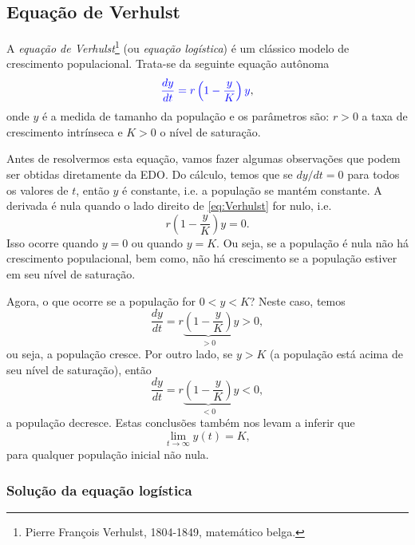 \subsection{Equação de Verhulst}

A \emph{equação de Verhulst}\footnote{Pierre François Verhulst, 1804-1849, matemático belga.} (ou \emph{equação logística}) é um clássico modelo de crescimento populacional. Trata-se da seguinte equação autônoma
\begin{equation}\label{eq:Verhulst}
  {\color{blue}\frac{dy}{dt} = r\left(1 - \frac{y}{K}\right)y},
\end{equation}
onde $y$ é a medida de tamanho da população e os parâmetros são: $r>0$ a taxa de crescimento intrínseca e $K>0$ o nível de saturação.

Antes de resolvermos esta equação, vamos fazer algumas observações que podem ser obtidas diretamente da EDO. Do cálculo, temos que se $dy/dt = 0$ para todos os valores de $t$, então $y$ é constante, i.e. a população se mantém constante. A derivada é nula quando o lado direito de \eqref{eq:Verhulst} for nulo, i.e.
\begin{equation}
  r\left(1 - \frac{y}{K}\right)y = 0.
\end{equation}
Isso ocorre quando $y = 0$ ou quando $y=K$. Ou seja, se a população é nula não há crescimento populacional, bem como, não há crescimento se a população estiver em seu nível de saturação.

Agora, o que ocorre se a população for $0 < y < K$? Neste caso, temos
\begin{equation}
  \frac{dy}{dt} = r\underbrace{\left(1 - \frac{y}{K}\right)}_{>0}y > 0,
\end{equation}
ou seja, a população cresce. Por outro lado, se $y > K$ (a população está acima de seu nível de saturação), então
\begin{equation}
  \frac{dy}{dt} = r\underbrace{\left(1 - \frac{y}{K}\right)}_{<0}y < 0,
\end{equation}
a população decresce. Estas conclusões também nos levam a inferir que
\begin{equation}
  \lim_{t\to\infty} y(t) = K,
\end{equation}
para qualquer população inicial não nula.

\subsubsection{Solução da equação logística}

